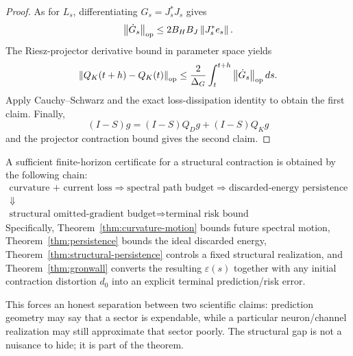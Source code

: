 \begin{proof}
As for $L_s$, differentiating $G_s=J_s^\ast J_s$ gives
\[
\left\lVert \dot G_s\right\rVert_{\mathrm{op}}
\le2B_HB_J\left\lVert J_s^\ast e_s\right\rVert.
\]
The Riesz-projector derivative bound in parameter space yields
\[
\left\lVert Q_K(t+h)-Q_K(t)\right\rVert_{\mathrm{op}}
\le\frac{2}{\Delta_G}\int_t^{t+h}\left\lVert \dot G_s\right\rVert_{\mathrm{op}}ds.
\]
Apply Cauchy--Schwarz and the exact loss-dissipation identity to obtain the first claim. Finally,
\[
(I-S)g=(I-S)Q_Dg+(I-S)Q_Kg
\]
and the projector contraction bound gives the second claim.
\end{proof}

\begin{corollary}\label{cor:master-certificate}
A sufficient finite-horizon certificate for a structural contraction is obtained by the following chain:
\[
\begin{gathered}
\text{curvature + current loss}
\Rightarrow
\text{spectral path budget}
\Rightarrow
\text{discarded-energy persistence}\\
\Downarrow\\
\text{structural omitted-gradient budget}
\Rightarrow
\text{terminal risk bound}
\end{gathered}
\]
Specifically, Theorem~\ref{thm:curvature-motion} bounds future spectral motion, Theorem~\ref{thm:persistence} bounds the ideal discarded energy, Theorem~\ref{thm:structural-persistence} controls a fixed structural realization, and Theorem~\ref{thm:gronwall} converts the resulting $\varepsilon(s)$ together with any initial contraction distortion $d_0$ into an explicit terminal prediction/risk error.
\end{corollary}

This forces an honest separation between two scientific claims: prediction geometry may say that a sector is expendable, while a particular neuron/channel realization may still approximate that sector poorly. The structural gap is not a nuisance to hide; it is part of the theorem.
